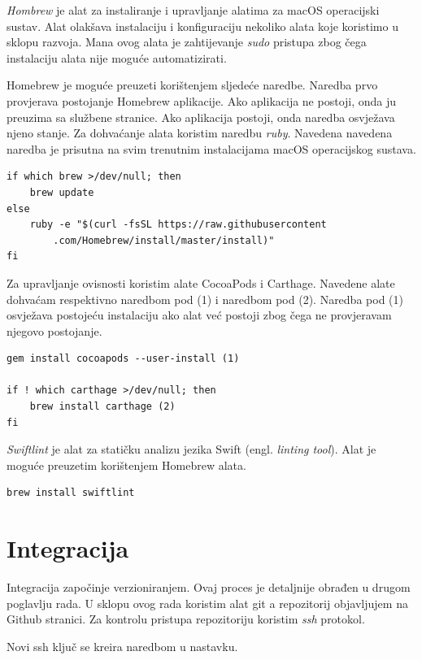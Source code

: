 \documentclass[times, utf8, diplomski, numeric]{fer}
\newcommand{\eng}[1]{(engl. \textit{#1})}
\begin{document}
\begin{appendices}
\textit{Hombrew} je alat za instaliranje i upravljanje alatima za macOS operacijski sustav. Alat olakšava instalaciju i konfiguraciju nekoliko alata koje koristimo u sklopu razvoja. Mana ovog alata je zahtijevanje \textit{sudo} pristupa zbog čega instalaciju alata nije moguće automatizirati.

Homebrew je moguće preuzeti korištenjem sljedeće naredbe. Naredba prvo provjerava postojanje Homebrew aplikacije. Ako aplikacija ne postoji, onda ju preuzima sa službene stranice. Ako aplikacija postoji, onda naredba osvježava njeno stanje. Za dohvaćanje alata koristim naredbu \textit{ruby}. Navedena navedena naredba je prisutna na svim trenutnim instalacijama macOS operacijskog sustava.

\begin{verbatim}
if which brew >/dev/null; then
    brew update
else
    ruby -e "$(curl -fsSL https://raw.githubusercontent
        .com/Homebrew/install/master/install)"
fi
\end{verbatim}

Za upravljanje ovisnosti koristim alate CocoaPods i Carthage. Navedene alate dohvaćam respektivno naredbom pod (1) i naredbom pod (2). Naredba pod (1) osvježava postojeću instalaciju ako alat već postoji zbog čega ne provjeravam njegovo postojanje.

\begin{verbatim}
gem install cocoapods --user-install (1)

if ! which carthage >/dev/null; then
    brew install carthage (2)
fi
\end{verbatim}

\textit{Swiftlint} je alat za statičku analizu jezika Swift \eng{linting tool}. Alat je moguće preuzetim korištenjem Homebrew alata.

\begin{verbatim}
brew install swiftlint
\end{verbatim}


\section{Integracija}

Integracija započinje verzioniranjem. Ovaj proces je detaljnije obrađen u drugom poglavlju rada. U sklopu ovog rada koristim alat git a repozitorij objavljujem na Github stranici. Za kontrolu pristupa repozitoriju koristim \textit{ssh} protokol.

Novi ssh ključ se kreira naredbom u nastavku.


\end{appendices}
\end{document}
